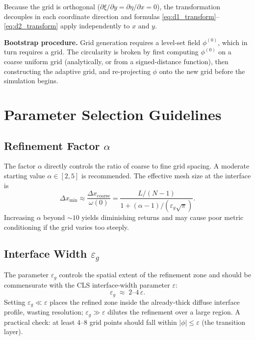 \documentclass[10pt,a4paper,twocolumn]{article}
\newcommand{\eps}{\varepsilon}
\begin{document}
Because the grid is orthogonal ($\partial\xi/\partial y =
\partial\eta/\partial x = 0$), the transformation decouples in each
coordinate direction and formulas \eqref{eq:d1_transform}--\eqref{eq:d2_transform}
apply independently to $x$ and $y$.

\textbf{Bootstrap procedure.}
Grid generation requires a level-set field $\phi^{(0)}$, which in turn
requires a grid. The circularity is broken by first computing $\phi^{(0)}$
on a coarse uniform grid (analytically, or from a signed-distance
function), then constructing the adaptive grid, and re-projecting $\phi$
onto the new grid before the simulation begins.

\section{Parameter Selection Guidelines}
\label{sec:param}

\subsection{Refinement Factor \texorpdfstring{$\alpha$}{alpha}}
\label{sec:param_alpha}

The factor $\alpha$ directly controls the ratio of coarse to fine grid
spacing. A moderate starting value $\alpha \in [2, 5]$ is recommended.
The effective mesh size at the interface is
\begin{equation}
  \Delta x_{\min} \approx \frac{\Delta x_{\mathrm{coarse}}}{\omega(0)}
  = \frac{L/(N-1)}{1 + (\alpha-1)/(\eps_g\sqrt{\pi})}.
  \label{eq:dxmin}
\end{equation}
Increasing $\alpha$ beyond $\sim\!10$ yields diminishing returns and
may cause poor metric conditioning if the grid varies too steeply.

\subsection{Interface Width \texorpdfstring{$\eps_g$}{epsilon\_g}}
\label{sec:param_eps}

The parameter $\eps_g$ controls the spatial extent of the refinement zone
and should be commensurate with the CLS interface-width parameter $\eps$:
\begin{equation}
  \eps_g \;\approx\; 2\text{--}4\,\eps.
  \label{eq:eps_g_rule}
\end{equation}
Setting $\eps_g \ll \eps$ places the refined zone inside the already-thick
diffuse interface profile, wasting resolution; $\eps_g \gg \eps$ dilutes
the refinement over a large region. A practical check: at least
$4$--$8$ grid points should fall within $|\phi| \le \eps$ (the transition
layer).
\end{document}
